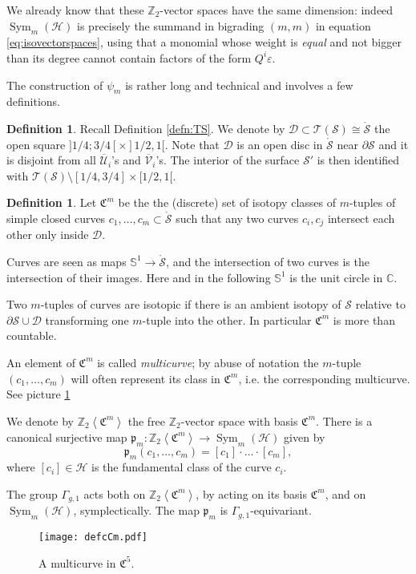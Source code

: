 \documentclass{amsart}
\theoremstyle{plain}
\theoremstyle{definition}
\newtheorem{defn}[thm]  {Definition}
\newcommand{\C}{\mathbb{C}}
\newcommand{\cC}{\mathfrak{C}}
\newcommand{\D}{\mathcal{D}}
\renewcommand{\H}{\mathcal{H}}
\renewcommand{\S}{\mathcal{S}}
\newcommand{\T}{\mathcal{T}}
\newcommand{\U}{\mathcal{U}}
\newcommand{\V}{\mathcal{V}}
\newcommand{\Z}{\mathbb{Z}}
\renewcommand{\gg}{\Gamma_{g,1}}
\newcommand{\pr}{\mathfrak{p}}
\newcommand{\ZcC}[1]{\Z_2\left<\cC^{#1}\right>}
\newcommand{\Sone}{\mathbb{S}^1}
\newcommand{\mrS}{\mathring{\S}}
\renewcommand{\epsilon}{\varepsilon}
\DeclareMathOperator{\Sym}{Sym}
\begin{document}
We already know that these $\Z_2$-vector spaces have the same dimension:
indeed $\Sym_m(\H)$ is precisely the summand in bigrading $(m,m)$ in equation
\eqref{eq:isovectorspaces}, using that a monomial
 whose
weight is \emph{equal} and not bigger than its degree cannot contain factors of the form
$Q^i\epsilon$.

The construction of $\psi_m$ is rather long and technical and involves a few definitions.

\begin{defn}
\label{defn:DinTS} 
Recall Definition \ref{defn:TS}. We denote by $\D\subset\T(\S)\cong\mrS$ the open square $]1/4;3/4[\times]1/2,1[$.
Note that $\D$ is an open disc in $\mrS$ near $\partial\S$ and 
it is disjoint from all $\overline{\U}_i$'s and $\overline{\V}_i$'s. The interior of the surface $\S'$
is then identified with $\T(\S)\setminus [1/4,3/4]\times[1/2,1[$.
\end{defn}


\begin{defn}
\label{defn:cCm}
Let $\cC^m$ be the the (discrete) set of isotopy classes of $m$-tuples of simple closed curves $c_1,\dots,c_m\subset\mrS$
such that any two curves $c_i,c_j$ intersect each other only inside $\D$.
 
Curves are seen as maps $\Sone\to\mrS$, and the intersection of two curves is the intersection of their
images. Here and in the following $\Sone$ is the unit circle in $\C$.

Two $m$-tuples of curves are isotopic if there is an ambient isotopy of $\S$ relative to $\partial\S\cup\D$
transforming one $m$-tuple into the other. In particular $\cC^m$ is more than countable.

An element of $\cC^m$ is called \emph{multicurve}; by abuse of notation the $m$-tuple
$(c_1,\dots,c_m)$ will often represent its class in $\cC^m$, i.e. the corresponding multicurve.
See picture \ref{fig:defcCm}

We denote by $\ZcC{m}$ the free $\Z_2$-vector space with basis $\cC^m$.
There is a canonical surjective map $\pr_m\colon\ZcC{m}\to\Sym_m(\H)$ given by
\[
 \pr_m(c_1,\dots,c_m)=[c_1]\cdot\ldots\cdot[c_m],
\]
where $[c_i]\in\H$ is the fundamental class of the curve $c_i$.

The group $\gg$ acts both on $\ZcC{m}$, by acting on its basis $\cC^m$, and
on $\Sym_m(\H)$, symplectically. The map $\pr_m$ is $\gg$-equivariant.
\end{defn}

\begin{figure}[ht]\centering
 \texttt{[image: defcCm.pdf]}
 \caption{A multicurve in $\cC^5$.}
\label{fig:defcCm}
\end{figure}
\end{document}
